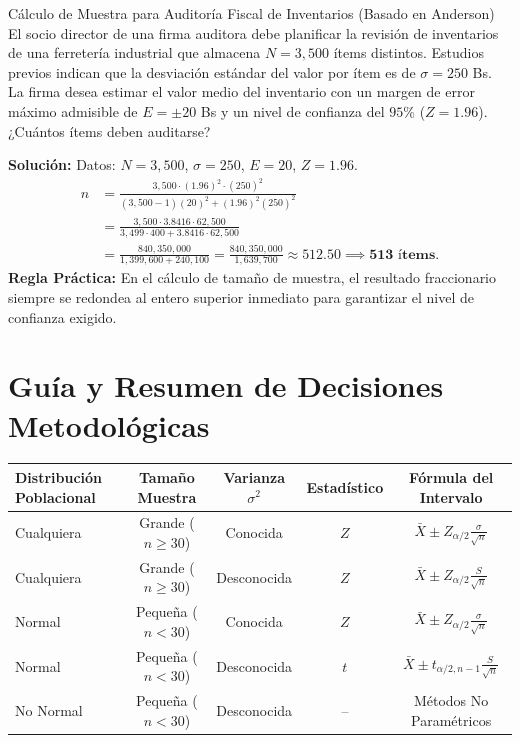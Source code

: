 \begin{ejemplo}{Cálculo de Muestra para Auditoría Fiscal de Inventarios (Basado en Anderson)}
El socio director de una firma auditora debe planificar la revisión de inventarios de una ferretería industrial que almacena $N = 3{,}500$ ítems distintos. Estudios previos indican que la desviación estándar del valor por ítem es de $\sigma = 250$ Bs. La firma desea estimar el valor medio del inventario con un margen de error máximo admisible de $E = \pm 20$ Bs y un nivel de confianza del $95\%$ ($Z = 1.96$). ¿Cuántos ítems deben auditarse?

\tcbline
\textbf{Solución:}
Datos: $N = 3{,}500$, $\sigma = 250$, $E = 20$, $Z = 1.96$.
\begin{align*}
    n &= \frac{3{,}500 \cdot (1.96)^2 \cdot (250)^2}{(3{,}500 - 1)(20)^2 + (1.96)^2 (250)^2} \\
    &= \frac{3{,}500 \cdot 3.8416 \cdot 62{,}500}{3{,}499 \cdot 400 + 3.8416 \cdot 62{,}500} \\
    &= \frac{840{,}350{,}000}{1{,}399{,}600 + 240{,}100} = \frac{840{,}350{,}000}{1{,}639{,}700} \approx 512.50 \implies \mathbf{513 \text{ ítems.}}
\end{align*}
\textbf{Regla Práctica:} En el cálculo de tamaño de muestra, el resultado fraccionario siempre se redondea al entero superior inmediato para garantizar el nivel de confianza exigido.
\end{ejemplo}

\section{Guía y Resumen de Decisiones Metodológicas}
\begin{center}
\begin{tabularx}{\textwidth}{lcccc}
\toprule
\textbf{Distribución Poblacional} & \textbf{Tamaño Muestra} & \textbf{Varianza $\sigma^2$} & \textbf{Estadístico} & \textbf{Fórmula del Intervalo} \\
\midrule
Cualquiera & Grande ($n \ge 30$) & Conocida & $Z$ & $\bar{X} \pm Z_{\alpha/2} \frac{\sigma}{\sqrt{n}}$ \\
Cualquiera & Grande ($n \ge 30$) & Desconocida & $Z$ & $\bar{X} \pm Z_{\alpha/2} \frac{S}{\sqrt{n}}$ \\
Normal & Pequeña ($n < 30$) & Conocida & $Z$ & $\bar{X} \pm Z_{\alpha/2} \frac{\sigma}{\sqrt{n}}$ \\
Normal & Pequeña ($n < 30$) & Desconocida & $t$ & $\bar{X} \pm t_{\alpha/2, n-1} \frac{S}{\sqrt{n}}$ \\
No Normal & Pequeña ($n < 30$) & Desconocida & -- & Métodos No Paramétricos \\
\bottomrule
\end{tabularx}
\end{center}

